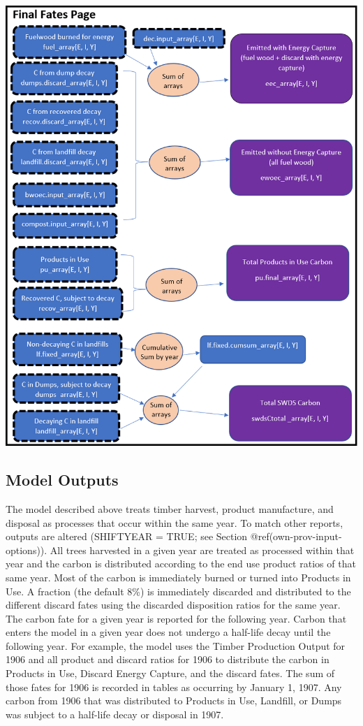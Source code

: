 \documentclass[
  openany]{book}
\begin{document}
\newpage

\includegraphics[width=1\linewidth]{images/schematic-7}

\hypertarget{model-func-out}{%
\subsection{Model Outputs}\label{model-func-out}}

The model described above treats timber harvest, product manufacture,
and disposal as processes that occur within the same year. To match
other reports, outputs are altered (SHIFTYEAR = TRUE; see Section
@ref(own-prov-input-options)). All trees harvested in a given year are
treated as processed within that year and the carbon is distributed
according to the end use product ratios of that same year. Most of the
carbon is immediately burned or turned into Products in Use. A fraction
(the default 8\%) is immediately discarded and distributed to the
different discard fates using the discarded disposition ratios for the
same year. The carbon fate for a given year is reported for the
following year. Carbon that enters the model in a given year does not
undergo a half-life decay until the following year. For example, the
model uses the Timber Production Output for 1906 and all product and
discard ratios for 1906 to distribute the carbon in Products in Use,
Discard Energy Capture, and the discard fates. The sum of those fates
for 1906 is recorded in tables as occurring by January 1, 1907. Any
carbon from 1906 that was distributed to Products in Use, Landfill, or
Dumps was subject to a half-life decay or disposal in 1907.
\end{document}
